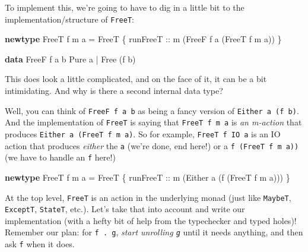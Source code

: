 \documentclass[]{article}
\newenvironment{Shaded}{}{}
\newcommand{\DataTypeTok}[1]{\textcolor[rgb]{0.56,0.13,0.00}{#1}}
\newcommand{\KeywordTok}[1]{\textcolor[rgb]{0.00,0.44,0.13}{\textbf{#1}}}
\newcommand{\NormalTok}[1]{#1}
\newcommand{\OperatorTok}[1]{\textcolor[rgb]{0.40,0.40,0.40}{#1}}
\newcommand{\OtherTok}[1]{\textcolor[rgb]{0.00,0.44,0.13}{#1}}
\begin{document}
To implement this, we're going to have to dig in a little bit to the
implementation/structure of \texttt{FreeT}:

\begin{Shaded}
\begin{Highlighting}[]
\KeywordTok{newtype} \DataTypeTok{FreeT}\NormalTok{ f m a }\OtherTok{=} \DataTypeTok{FreeT}
\NormalTok{    \{}\OtherTok{ runFreeT ::}\NormalTok{ m (}\DataTypeTok{FreeF}\NormalTok{ f a (}\DataTypeTok{FreeT}\NormalTok{ f m a)) \}}

\KeywordTok{data} \DataTypeTok{FreeF}\NormalTok{ f a b}
      \DataTypeTok{Pure}\NormalTok{ a}
    \OperatorTok{|} \DataTypeTok{Free}\NormalTok{ (f b)}
\end{Highlighting}
\end{Shaded}

This does look a little complicated, and on the face of it, it can be a bit
intimidating. And why is there a second internal data type?

Well, you can think of \texttt{FreeF\ f\ a\ b} as being a fancy version of
\texttt{Either\ a\ (f\ b)}. And the implementation of \texttt{FreeT} is saying
that \texttt{FreeT\ f\ m\ a} is \emph{an m-action} that produces
\texttt{Either\ a\ (FreeT\ f\ m\ a)}. So for example, \texttt{FreeT\ f\ IO\ a}
is an IO action that produces \emph{either} the \texttt{a} (we're done, end
here!) or a \texttt{f\ (FreeT\ f\ m\ a))} (we have to handle an \texttt{f}
here!)

\begin{Shaded}
\begin{Highlighting}[]
\KeywordTok{newtype} \DataTypeTok{FreeT}\NormalTok{ f m a }\OtherTok{=} \DataTypeTok{FreeT}
\NormalTok{    \{}\OtherTok{ runFreeT ::}\NormalTok{ m (}\DataTypeTok{Either}\NormalTok{ a (f (}\DataTypeTok{FreeT}\NormalTok{ f m a))) \}}
\end{Highlighting}
\end{Shaded}

At the top level, \texttt{FreeT} is an action in the underlying monad (just like
\texttt{MaybeT}, \texttt{ExceptT}, \texttt{StateT}, etc.). Let's take that into
account and write our implementation (with a hefty bit of help from the
typechecker and typed holes)! Remember our plan: for \texttt{f\ .\textbar{}\ g},
\emph{start unrolling \texttt{g}} until it needs anything, and then ask
\texttt{f} when it does.
\end{document}
